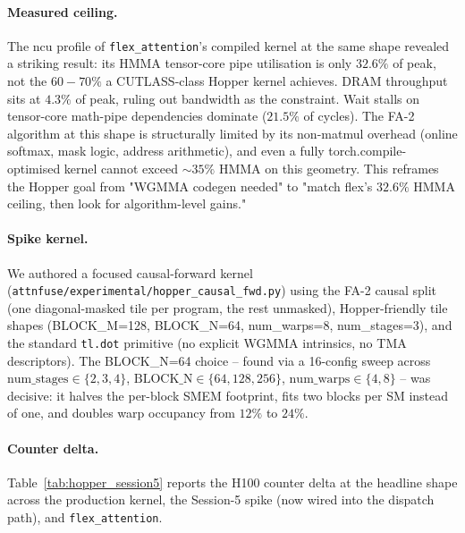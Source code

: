 \paragraph{Measured ceiling.} The ncu profile of
\texttt{flex\_attention}'s compiled kernel at the same shape revealed
a striking result: its HMMA tensor-core pipe utilisation is only
$32.6\%$ of peak, not the $60{-}70\%$ a CUTLASS-class Hopper kernel
achieves. DRAM throughput sits at $4.3\%$ of peak, ruling out
bandwidth as the constraint. Wait stalls on tensor-core math-pipe
dependencies dominate ($21.5\%$ of cycles). The FA-2 algorithm at this
shape is structurally limited by its non-matmul overhead (online
softmax, mask logic, address arithmetic), and even a fully
torch.compile-optimised kernel cannot exceed $\sim35\%$ HMMA on this
geometry. This reframes the Hopper goal from "WGMMA codegen needed"
to "match flex's $32.6\%$ HMMA ceiling, then look for algorithm-level
gains."

\paragraph{Spike kernel.} We authored a focused causal-forward kernel
(\texttt{attnfuse/experimental/hopper\_causal\_fwd.py}) using the FA-2
causal split (one diagonal-masked tile per program, the rest
unmasked), Hopper-friendly tile shapes (BLOCK\_M=128, BLOCK\_N=64,
num\_warps=8, num\_stages=3), and the standard \texttt{tl.dot}
primitive (no explicit WGMMA intrinsics, no TMA descriptors). The
BLOCK\_N=64 choice -- found via a 16-config sweep across
$\text{num\_stages} \in \{2,3,4\}$, $\text{BLOCK\_N} \in \{64,128,256\}$,
$\text{num\_warps} \in \{4,8\}$ -- was decisive: it halves the
per-block SMEM footprint, fits two blocks per SM instead of one, and
doubles warp occupancy from $12\%$ to $24\%$.

\paragraph{Counter delta.} Table~\ref{tab:hopper_session5} reports the
H100 counter delta at the headline shape across the production
kernel, the Session-5 spike (now wired into the dispatch path), and
\texttt{flex\_attention}.

